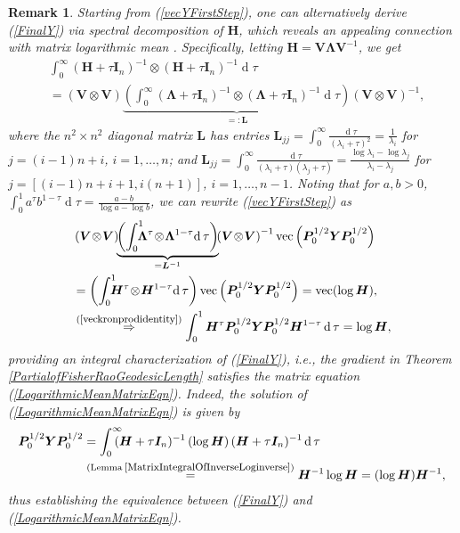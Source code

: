 \documentclass[letterpaper,10pt,twocolumn,conference]{ieeeconf}
\newtheorem{remark}{Remark}
\newcommand{\bbP}{{\bm{P}}}
\newcommand{\bbI}{\bm{I}}
\newcommand{\bbL}{\bm{L}}
\newcommand{\bbH}{\bm{H}}
\newcommand{\bbY}{\bm{Y}}
\newcommand{\bbV}{\bm{V}}
\newcommand{\bbLambda}{\bm{\Lambda}}
\newcommand{\differential}{\operatorname{d}}
\renewcommand{\vec}{\operatorname{vec}}
\begin{document}
\begin{remark}
Starting from (\ref{vecYFirstStep}), one can alternatively derive (\ref{FinalY}) via spectral decomposition of $\bbH$, which reveals an appealing connection with matrix logarithmic mean \cite{BhatiaLogarithmic2008}. Specifically, letting $\bbH=\bbV\bbLambda\bbV^{-1}$, we get	
{\small{\begin{align*}
&\displaystyle\int_{0}^{\infty}\!\!\!\!(\bbH + \tau\bbI_{n})^{-1}\otimes(\bbH + \tau\bbI_{n})^{-1}\differential\tau\nonumber\\
&= \left(\bbV\!\otimes\!\bbV\right)\!\!\underbrace{\left(\displaystyle\int_{0}^{\infty}\!\!\!\!(\bbLambda + \tau\bbI_{n})^{-1}\!\otimes\!(\bbLambda + \tau\bbI_{n})^{-1}\!\differential\tau\right)}_{=:\bbL}\!\!\left(\bbV\!\otimes\!\bbV\right)^{-1},
\end{align*}}}
\!\!where the $n^{2}\times n^{2}$ diagonal matrix $\bbL$ has entries $\bbL_{jj}=\displaystyle\int_{0}^{\infty}\!\!\!\!\displaystyle\frac{\differential\tau}{(\lambda_{i} + \tau)^{2}} =\displaystyle\frac{1}{\lambda_{i}}$ for $j=(i-1)n+i$, $i=1,\hdots,n$; and $\bbL_{jj}=\displaystyle\int_{0}^{\infty}\!\!\!\!\displaystyle\frac{\differential\tau}{(\lambda_{i} + \tau)(\lambda_{j} + \tau)} = \displaystyle\frac{\log \lambda_{i} - \log \lambda_{j}}{\lambda_{i} - \lambda_{j}}$ for $j = [(i-1)n+i+1, i(n+1)]$, $i=1,\hdots,n-1$. Noting that for $a,b>0$, $\displaystyle\int_{0}^{1} a^{\tau}b^{1-\tau}\differential\tau = \displaystyle\frac{a-b}{\log a - \log b}$, we can rewrite (\ref{vecYFirstStep}) as
\begin{align}
&\left(\bbV\!\otimes\!\bbV\right)\!\!\underbrace{\left(\displaystyle\int_{0}^{1}\!\!\!\!\bbLambda^{\tau}\!\otimes\!\bbLambda^{1-\tau}\!\differential\tau\right)}_{=\bbL^{-1}}\!\!\left(\bbV\!\otimes\!\bbV\right)^{-1}\vec\left(\bbP_{0}^{1/2}\bbY\bbP_{0}^{1/2}\right) \nonumber\\
&= \left(\displaystyle\int_{0}^{1}\!\!\!\!\bbH^{\tau}\!\otimes\!\bbH^{1-\tau}\!\differential\tau\right)	\vec\left(\bbP_{0}^{1/2}\bbY\bbP_{0}^{1/2}\right) =  \vec(\log\bbH),\nonumber\\
&\stackrel{\footnotesize{(\ref{veckronprodidentity})}}{\Rightarrow} \displaystyle\int_{0}^{1}\bbH^{\tau}\bbP_{0}^{1/2}\bbY\bbP_{0}^{1/2}\bbH^{1-\tau}\differential\tau = \log\bbH,
\label{LogarithmicMeanMatrixEqn}
\end{align}
providing an integral characterization of (\ref{FinalY}), i.e., the gradient in Theorem \ref{PartialofFisherRaoGeodesicLength} satisfies the matrix equation (\ref{LogarithmicMeanMatrixEqn}). Indeed, the solution of (\ref{LogarithmicMeanMatrixEqn}) is given by \cite[equations (5.4.3) and (5.4.8)]{Hiai2010} 
{\small{\begin{align*}
\bbP_{0}^{1/2}\bbY\bbP_{0}^{1/2} &= \displaystyle\int_{0}^{\infty}\!\!\!\!(\bbH + \tau\bbI_{n})^{-1}\left(\log\bbH\right)(\bbH + \tau\bbI_{n})^{-1}\differential\tau \nonumber \\
&\stackrel{{\footnotesize{(\text{Lemma} \:\ref{MatrixIntegralOfInverseLoginverse})}}}{=} \bbH^{-1}\log\bbH =\allowbreak (\log\bbH)\bbH^{-1},
\end{align*}}}
thus establishing the equivalence between (\ref{FinalY}) and (\ref{LogarithmicMeanMatrixEqn}).
\end{remark}
\end{document}
